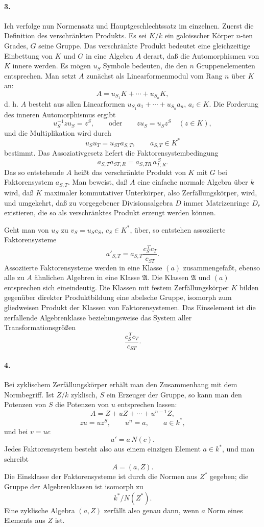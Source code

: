 \documentclass[11pt]{article}
\begin{document}
\paragraph{3.}
Ich verfolge nun Normensatz und Hauptgeschlechtssatz im einzelnen. Zuerst die Definition des verschränkten Produkts. Es sei \(K/k\) ein galoisscher Körper \(n\)-ten Grades, \(G\) seine Gruppe. Das verschränkte Produkt bedeutet eine gleichzeitige Einbettung von \(K\) und \(G\) in eine Algebra \(A\) derart, daß die Automorphismen von \(K\) innere werden. Es mögen \(u_S\) Symbole bedeuten, die den \(n\) Gruppenelementen entsprechen. Man setzt \(A\) zunächst als Linearformenmodul vom Rang \(n\) über \(K\) an:
\[
        A=u_{S_1}K+\cdots+u_{S_n}K ,
\]
d. h. \(A\) besteht aus allen Linearformen \(u_{S_1}a_1+\cdots+u_{S_n}a_n\), \(a_i\in K\). Die Forderung des inneren Automorphismus ergibt
\[
        u_S^{-1}zu_S=z^S,\qquad\text{oder}\qquad
        zu_S=u_Sz^S\quad (z\in K),
\]
und die Multiplikation wird durch
\[
        u_Su_T=u_{ST}a_{S,T},\qquad a_{S,T}\in K^*
\]
bestimmt. Das Assoziativgesetz liefert die Faktorensystembedingung
\[
        a_{S,T}a_{ST,R}=a_{S,TR}\,a_{T,R}^{\,S}.
\]
Das so entstehende \(A\) heißt das verschränkte Produkt von \(K\) mit \(G\) bei Faktorensystem \(a_{S,T}\). Man beweist, daß \(A\) eine einfache normale Algebra über \(k\) wird, daß \(K\) maximaler kommutativer Unterkörper, also Zerfällungskörper, wird, und umgekehrt, daß zu vorgegebener Divisionsalgebra \(D\) immer Matrizenringe \(D_r\) existieren, die so als verschränktes Produkt erzeugt werden können.

Geht man von \(u_S\) zu \(v_S=u_Sc_S\), \(c_S\in K^*\), über, so entstehen assoziierte Faktorensysteme
\[
        a'_{S,T}=a_{S,T}\frac{c_S^{\,T}c_T}{c_{ST}}.
\]
Assoziierte Faktorensysteme werden in eine Klasse \((a)\) zusammengefaßt, ebenso alle zu \(A\) ähnlichen Algebren in eine Klasse \(\mathfrak A\). Die Klassen \(\mathfrak A\) und \((a)\) entsprechen sich eineindeutig. Die Klassen mit festem Zerfällungskörper \(K\) bilden gegenüber direkter Produktbildung eine abelsche Gruppe, isomorph zum gliedweisen Produkt der Klassen von Faktorensystemen. Das Einselement ist die zerfallende Algebrenklasse beziehungsweise das System aller Transformationsgrößen
\[
        \frac{c_S^{\,T}c_T}{c_{ST}}.
\]

\paragraph{4.}
Bei zyklischem Zerfällungskörper erhält man den Zusammenhang mit dem Normbegriff. Ist \(Z/k\) zyklisch, \(S\) ein Erzeuger der Gruppe, so kann man den Potenzen von \(S\) die Potenzen von \(u\) entsprechen lassen:
\[
        A=Z+uZ+\cdots+u^{n-1}Z,
\]
\[
        zu=uz^S,\qquad u^n=a,\qquad a\in k^*,
\]
und bei \(v=uc\)
\[
        a'=a\,N(c).
\]
Jedes Faktorensystem besteht also aus einem einzigen Element \(a\in k^*\), und man schreibt
\[
        A=(a,Z).
\]
Die Einsklasse der Faktorensysteme ist durch die Normen aus \(Z^*\) gegeben; die Gruppe der Algebrenklassen ist isomorph zu
\[
        k^*/N(Z^*).
\]
Eine zyklische Algebra \((a,Z)\) zerfällt also genau dann, wenn \(a\) Norm eines Elements aus \(Z\) ist.
\end{document}
